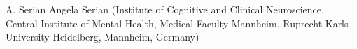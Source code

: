 
                {A.  Serian}
                {Angela Serian (Institute of Cognitive and Clinical Neuroscience, Central Institute of Mental Health, Medical Faculty Mannheim, Ruprecht-Karls-University Heidelberg, Mannheim, Germany)}
                
